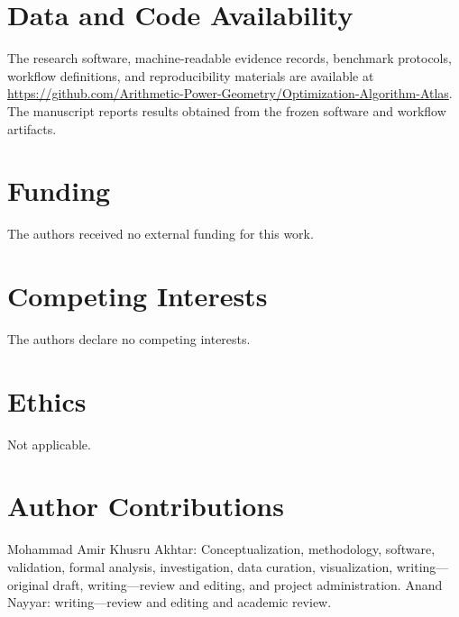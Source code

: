 \section*{Data and Code Availability}
The research software, machine-readable evidence records, benchmark protocols, workflow definitions, and reproducibility materials are available at \url{https://github.com/Arithmetic-Power-Geometry/Optimization-Algorithm-Atlas}. The manuscript reports results obtained from the frozen software and workflow artifacts.

\section*{Funding}
The authors received no external funding for this work.

\section*{Competing Interests}
The authors declare no competing interests.

\section*{Ethics}
Not applicable.

\section*{Author Contributions}
Mohammad Amir Khusru Akhtar: Conceptualization, methodology, software, validation, formal analysis, investigation, data curation, visualization, writing---original draft, writing---review and editing, and project administration. Anand Nayyar: writing---review and editing and academic review.
